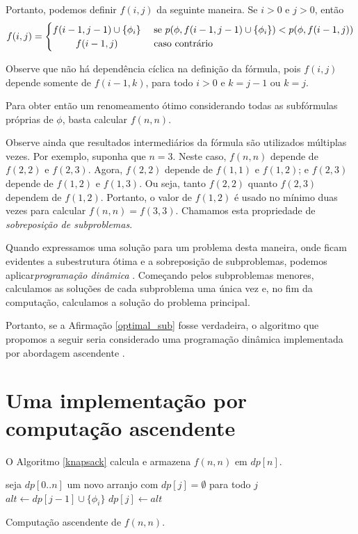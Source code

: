 Portanto, podemos definir $f(i,j)$ da seguinte maneira. Se $i > 0$ e $j > 0$, então
\[
f(i,j) =
\begin{cases} 
\hfill f(i-1,j-1) \cup \{\phi_i \}   \hfill & \text{ se } p(\phi,f(i-1,j-1) \cup \{\phi_i \}) < p(\phi,f(i-1,j)) \\
\hfill f(i-1,j) \hfill & \text{ caso contrário} \\
\end{cases}
\]

Observe que não há dependência cíclica na definição da fórmula, pois $f(i,j)$ depende somente de $f(i-1,k)$, para todo $i > 0$ e $k=j-1$ ou $k=j$.

Para obter então um renomeamento ótimo considerando todas as subfórmulas próprias de $\phi$, basta calcular $f(n,n)$.

Observe ainda que resultados intermediários da fórmula são utilizados múltiplas vezes. Por exemplo, suponha que $n = 3$. Neste caso, $f(n,n)$ depende de $f(2,2)$ e $f(2,3)$. Agora, $f(2,2)$ depende de $f(1,1)$ e $f(1,2)$; e $f(2,3)$ depende de $f(1,2)$ e $f(1,3)$. Ou seja, tanto $f(2,2)$ quanto $f(2,3)$ dependem de $f(1,2)$. Portanto, o valor de $f(1,2)$ é usado no mínimo duas vezes para calcular $f(n,n) = f(3,3)$. Chamamos esta propriedade de \emph{sobreposição de subproblemas}.

Quando expressamos uma solução para um problema desta maneira, onde ficam evidentes a subestrutura ótima e a sobreposição de subproblemas, podemos aplicar\break \emph{programação dinâmica} \cite{bellman2015applied}. Começando pelos subproblemas menores, calculamos as soluções de cada subproblema uma única vez e, no fim da computação, calculamos a solução do problema principal.

Portanto, se a Afirmação \ref{optimal_sub} fosse verdadeira, o algoritmo que propomos a seguir seria considerado uma programação dinâmica implementada por abordagem ascendente \cite{bellman2015applied}.

\section{Uma implementação por computação ascendente}

\indent

O Algoritmo \ref{knapsack} calcula e armazena $f(n,n)$ em $dp[n]$.

\begin{algorithm}
	\begin{algorithmic}[1]
		\State seja $dp[0..n]$ um novo arranjo com $dp[j] = \emptyset$ para todo $j$
				\State $alt \gets dp[j-1] \cup \{\phi_i\}$
					\State $dp[j] \gets alt$
				\EndIf
			\EndFor
		\EndFor
	\end{algorithmic}
	\caption{Computação ascendente de $f(n,n)$.}
	\label{knapsack}
\end{algorithm}

